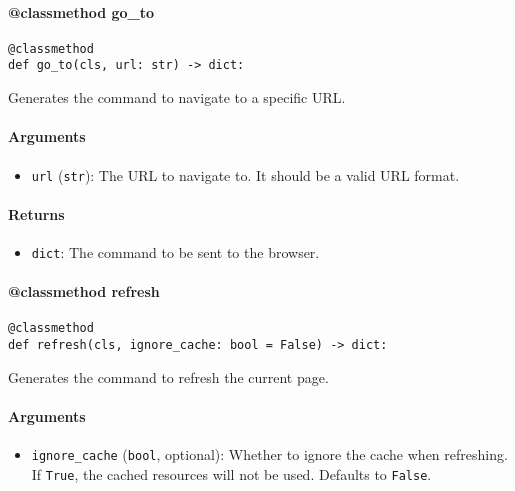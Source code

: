 \documentclass{article}
\begin{document}
\paragraph{@classmethod go\_to}

\begin{lstlisting}[style=pythonstyle]
@classmethod
def go_to(cls, url: str) -> dict:
\end{lstlisting}

\noindent Generates the command to navigate to a specific URL.

\paragraph{Arguments}

\begin{itemize}
    \item \lstinline[style=pythonstyle]|url| (\lstinline[style=pythonstyle]|str|): The URL to navigate to. It should be a valid URL format.
\end{itemize}

\paragraph{Returns}

\begin{itemize}
    \item \lstinline[style=pythonstyle]|dict|: The command to be sent to the browser.
\end{itemize}

\paragraph{@classmethod refresh}

\begin{lstlisting}[style=pythonstyle]
@classmethod
def refresh(cls, ignore_cache: bool = False) -> dict:
\end{lstlisting}

\noindent Generates the command to refresh the current page.

\paragraph{Arguments}

\begin{itemize}
    \item \lstinline[style=pythonstyle]|ignore_cache| (\lstinline[style=pythonstyle]|bool|, optional): Whether to ignore the cache when refreshing. If \lstinline[style=pythonstyle]|True|, the cached resources will not be used. Defaults to \lstinline[style=pythonstyle]|False|.
\end{itemize}
\end{document}

